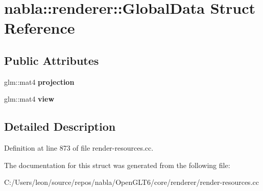 \hypertarget{structnabla_1_1renderer_1_1_global_data}{}\section{nabla\+::renderer\+::Global\+Data Struct Reference}
\label{structnabla_1_1renderer_1_1_global_data}
\subsection*{Public Attributes}
\begin{DoxyCompactItemize}
\item 
\mbox{\label{structnabla_1_1renderer_1_1_global_data_ac4871dd19acc231da4f98ff15b66c252}} 
glm\+::mat4 {\bfseries projection}
\item 
\mbox{\label{structnabla_1_1renderer_1_1_global_data_ae2b1edf95d1cd249191c0d3ae32c7228}} 
glm\+::mat4 {\bfseries view}
\end{DoxyCompactItemize}


\subsection{Detailed Description}


Definition at line 873 of file render-\/resources.\+cc.



The documentation for this struct was generated from the following file\+:\begin{DoxyCompactItemize}
\item 
C\+:/\+Users/leon/source/repos/nabla/\+Open\+G\+L\+T6/core/renderer/render-\/resources.\+cc\end{DoxyCompactItemize}
